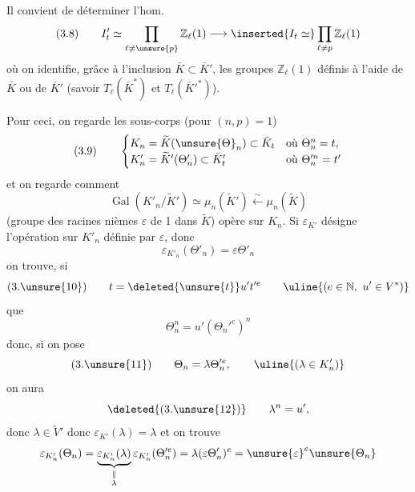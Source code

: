 
Il convient de déterminer l'hom.
\[
(3.8)\qquad I'_t\simeq\prod_{\ell\ne\unsure{p}}\mathbb Z_\ell(1)\longrightarrow\inserted{I_t\simeq}\prod_{\ell\ne p}\mathbb Z_\ell(1)
\]
où on identifie, grâce à l'inclusion $\bar K\subset\bar K'$, les  groupes $\mathbb Z_\ell(1)$ définis à l'aide de $\bar K$ ou de $\bar K'$ (savoir $T_\ell(\bar K^*)$ et $T_\ell(\bar K'^*)$).

Pour ceci, on regarde les sous-corps (pour $(n,p)=1$)
\[
(3.9)\qquad\begin{cases}
 K_n=\widetilde K(\unsure{\Theta}_n)\subset\bar K_t&\text{où }\Theta_n^n=t,\\
 K'_n=\widetilde K'(\Theta'_n)\subset\bar K'_t&\text{où }\Theta_n'^n=t'
\end{cases}
\]
et on regarde comment
\[
\operatorname{Gal}(K'_n/\widetilde K')\simeq\mu_n(\widetilde K')\xleftarrow{\sim}\mu_n(\widetilde K)
\]
(groupe des racines nièmes $\varepsilon$ de 1 dans $\widetilde K$) opère sur $K_n$. Si $\varepsilon_{K'}$ désigne l'opération sur $K'_n$ définie par $\varepsilon$, donc
\[
\varepsilon_{K'_n}(\Theta'_n)=\varepsilon\Theta'_n
\]
on trouve, si
\[
(3.\unsure{10})\qquad t=\deleted{\unsure{t}}u't'^e\qquad\uline{(e\in\mathbb N,\ u'\in V^*)}
\]
que
\[
\Theta_n^n=u'(\Theta_n'^e)^n
\]
donc, si on pose
\[
(3.\unsure{11})\qquad\Theta_n=\lambda\Theta_n'^e,\qquad\uline{(\lambda\in K'_n)}
\]
on aura
\[
\deleted{(3.\unsure{12})}\qquad\lambda^n=u',
\]
donc  $\lambda\in\widetilde V'$  donc $\varepsilon_{K'}(\lambda)=\lambda$
et on trouve
\[
\varepsilon_{K'_n}(\Theta_n)=\underbrace{\varepsilon_{K'_n}(\lambda)}_{\substack{\Vert\\\lambda}}\varepsilon_{K'_n}(\Theta_n'^e)=\lambda(\varepsilon\Theta'_n)^e=\unsure{\varepsilon}^e\unsure{\Theta_n}
\]
